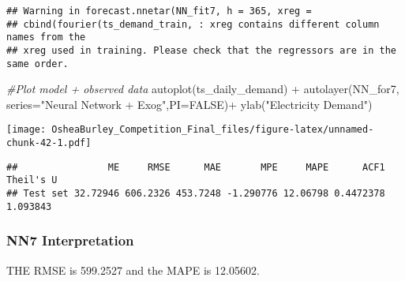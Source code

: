 \documentclass[
]{article}
\newenvironment{Shaded}{\begin{snugshade}}{\end{snugshade}}
\newcommand{\AttributeTok}[1]{\textcolor[rgb]{0.77,0.63,0.00}{#1}}
\newcommand{\CommentTok}[1]{\textcolor[rgb]{0.56,0.35,0.01}{\textit{#1}}}
\newcommand{\ConstantTok}[1]{\textcolor[rgb]{0.00,0.00,0.00}{#1}}
\newcommand{\FunctionTok}[1]{\textcolor[rgb]{0.00,0.00,0.00}{#1}}
\newcommand{\NormalTok}[1]{#1}
\newcommand{\OtherTok}[1]{\textcolor[rgb]{0.56,0.35,0.01}{#1}}
\newcommand{\SpecialCharTok}[1]{\textcolor[rgb]{0.00,0.00,0.00}{#1}}
\newcommand{\StringTok}[1]{\textcolor[rgb]{0.31,0.60,0.02}{#1}}
\begin{document}
\begin{verbatim}
## Warning in forecast.nnetar(NN_fit7, h = 365, xreg =
## cbind(fourier(ts_demand_train, : xreg contains different column names from the
## xreg used in training. Please check that the regressors are in the same order.
\end{verbatim}

\begin{Shaded}
\begin{Highlighting}[]
\CommentTok{\#Plot model + observed data}
\FunctionTok{autoplot}\NormalTok{(ts\_daily\_demand) }\SpecialCharTok{+}
  \FunctionTok{autolayer}\NormalTok{(NN\_for7, }\AttributeTok{series=}\StringTok{"Neural Network + Exog"}\NormalTok{,}\AttributeTok{PI=}\ConstantTok{FALSE}\NormalTok{)}\SpecialCharTok{+}
  \FunctionTok{ylab}\NormalTok{(}\StringTok{"Electricity Demand"}\NormalTok{) }
\end{Highlighting}
\end{Shaded}

\texttt{[image: OsheaBurley\_Competition\_Final\_files/figure-latex/unnamed-chunk-42-1.pdf]}

\begin{Shaded}
\end{Shaded}

\begin{verbatim}
##                ME     RMSE      MAE       MPE     MAPE      ACF1 Theil's U
## Test set 32.72946 606.2326 453.7248 -1.290776 12.06798 0.4472378  1.093843
\end{verbatim}

\begin{Shaded}
\end{Shaded}

\hypertarget{nn7-interpretation}{%
\subsubsection{NN7 Interpretation}\label{nn7-interpretation}}

THE RMSE is 599.2527 and the MAPE is 12.05602.
\end{document}
